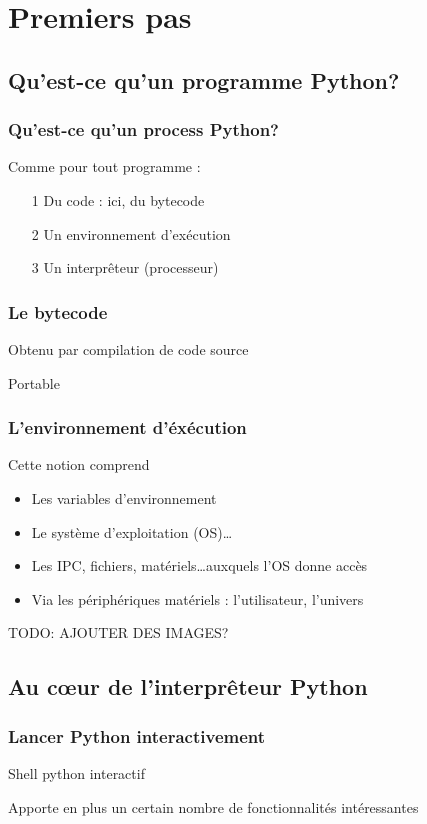 \section{Premiers pas}

\subsection{Qu'est-ce qu'un programme Python?}
\begin{frame}[fragile]
  \frametitle{Qu'est-ce qu'un process Python?}
  Comme pour tout programme :
  \begin{itemize}
    \item[1] Du code : ici, du bytecode
    \item[2] Un environnement d'exécution
    \item[3] Un interprêteur (processeur)
  \end{itemize}
\end{frame}

\begin{frame}[fragile]
  \frametitle{Le bytecode}
  \begin{llist}
    \item Obtenu par compilation de code source
    \item Portable
  \end{llist}
\end{frame}

\begin{frame}[fragile]
  \frametitle{L'environnement d'éxécution}
  Cette notion comprend
  \begin{itemize}
    \item Les variables d'environnement
    \item Le système d'exploitation (OS)\ldots
    \item Les IPC, fichiers, matériels\ldots auxquels l'OS donne accès
    \item Via les périphériques matériels : l'utilisateur, l'univers
  \end{itemize}
  TODO: AJOUTER DES IMAGES?
\end{frame}

\subsection{Au c\oe ur de l'interprêteur Python}
\begin{frame}[fragile]
  \frametitle{Lancer Python interactivement}
  \begin{llist}
    \item Shell python interactif
    \item Apporte en plus un certain nombre de fonctionnalités intéressantes
  \end{llist}
\end{frame}

